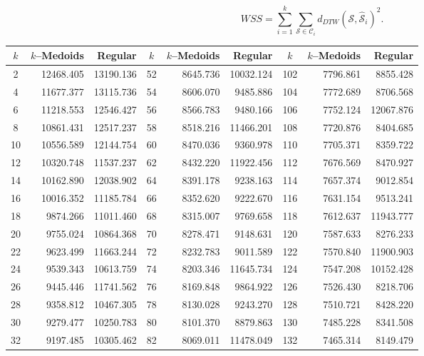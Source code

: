 \begin{equation}
    \label{Eq:WcSS}
    WSS = \sum_{i=1}^{k} \sum_{\mathcal{S} \in \mathcal{C}_{i}} d_{DTW} \left(\mathcal{S}, \mathcal{\hat{S}}_{i}\right)^{2}.
\end{equation}

\begin{table}[h]
	\centering
	\tiny
	\begin{tabular}{|c|r|r|c|r|r|c|r|r|}
		\hline
		$k$  & $k$--Medoids & Regular & $k$ & $k$--Medoids & Regular & $k$ & $k$--Medoids & Regular \\ \hline
		2  & 12468.405 & 13190.136 &  52 & 8645.736 & 10032.124 & 102 & 7796.861 &  8855.428 \\
		4  & 11677.377 & 13115.736 &  54 & 8606.070 &  9485.886 & 104 & 7772.689 &  8706.568 \\
		6  & 11218.553 & 12546.427 &  56 & 8566.783 &  9480.166 & 106 & 7752.124 & 12067.876 \\
		8  & 10861.431 & 12517.237 &  58 & 8518.216 & 11466.201 & 108 & 7720.876 &  8404.685 \\
		10 & 10556.589 & 12144.754 &  60 & 8470.036 &  9360.978 & 110 & 7705.371 &  8359.722 \\
		12 & 10320.748 & 11537.237 &  62 & 8432.220 & 11922.456 & 112 & 7676.569 &  8470.927 \\
		14 & 10162.890 & 12038.902 &  64 & 8391.178 &  9238.163 & 114 & 7657.374 &  9012.854 \\
		16 & 10016.352 & 11185.784 &  66 & 8352.620 &  9222.670 & 116 & 7631.154 &  9513.241 \\
		18 &  9874.266 & 11011.460 &  68 & 8315.007 &  9769.658 & 118 & 7612.637 & 11943.777 \\
		20 &  9755.024 & 10864.368 &  70 & 8278.471 &  9148.631 & 120 & 7587.633 &  8276.233 \\
		22 &  9623.499 & 11663.244 &  72 & 8232.783 &  9011.589 & 122 & 7570.840 & 11900.903 \\
		24 &  9539.343 & 10613.759 &  74 & 8203.346 & 11645.734 & 124 & 7547.208 & 10152.428 \\
		26 &  9445.446 & 11741.562 &  76 & 8169.848 &  9864.922 & 126 & 7526.430 &  8218.706 \\
		28 &  9358.812 & 10467.305 &  78 & 8130.028 &  9243.270 & 128 & 7510.721 &  8428.220 \\
		30 &  9279.477 & 10250.783 &  80 & 8101.370 &  8879.863 & 130 & 7485.228 &  8341.508 \\
		32 &  9197.485 & 10305.462 &  82 & 8069.011 & 11478.049 & 132 & 7465.314 &  8149.479 \\

\end{tabular}
\end{table}

